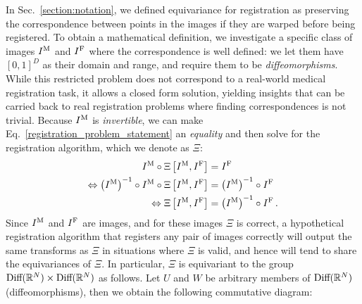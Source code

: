


In Sec.~\ref{section:notation}, we defined equivariance for registration as preserving the correspondence between points in the images if they are warped before being registered. To obtain a mathematical definition, we investigate a specific class of images ${I^\text{M}}$ and ${I^\text{F}}$ where the correspondence is well defined: we let them have $[0, 1]^D$ as their domain and range, and require them
to be \emph{diffeomorphisms}. While this restricted problem does not
correspond to a real-world medical registration task, it allows a closed
form solution, yielding insights that can be carried back to real registration problems where finding correspondences is not trivial. Because ${I^\text{M}}$ is \emph{invertible}, we can make
Eq.~\eqref{registration_problem_statement} an \emph{equality} and then solve for the
registration algorithm, which we denote as $\Xi$:
\begin{equation}
	\begin{split}
		{I^\text{M}} \circ \Xi\left[{I^\text{M}}, {I^\text{F}}\right]                                   & = {I^\text{F}}                       \\
		\Leftrightarrow \left({I^\text{M}}\right) ^{-1} \circ {I^\text{M}} \circ \Xi\left[{I^\text{M}}, {I^\text{F}}\right] & = \left({I^\text{M}}\right) ^{-1} \circ {I^\text{F}}     \\
		\Leftrightarrow  \Xi\left[{I^\text{M}}, {I^\text{F}}\right]                            & = \left({I^\text{M}}\right) ^{-1} \circ {I^\text{F}}\,.
	\end{split}
\end{equation}
Since ${I^\text{M}}$ and ${I^\text{F}}$ are images, and for these images $\Xi$ is correct, a hypothetical registration algorithm that registers any pair of images correctly
will output the same transforms as $\Xi$ in situations where $\Xi$ is valid,
and hence will tend to share the equivariances of $\Xi$. In particular, $\Xi$ is equivariant to the group $\text{Diff}(\mathbb{R}^N) \times \text{Diff}(\mathbb{R}^N)$ as follows. Let $U$ and $W$ be arbitrary members of $\text{Diff}(\mathbb{R}^N)$ (diffeomorphisms), then
we obtain the following commutative diagram:
